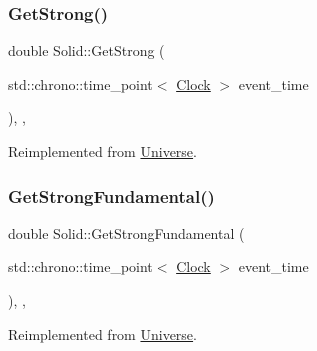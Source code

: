 \mbox{\label{classSolid_ae39d0166456b8feaa39547e5a21c9096}} 
\subsubsection{\texorpdfstring{Get\+Strong()}{GetStrong()}}
{\footnotesize\ttfamily double Solid\+::\+Get\+Strong (\begin{DoxyParamCaption}\item[{std\+::chrono\+::time\+\_\+point$<$ \mbox{\hyperlink{universe_8h_a0ef8d951d1ca5ab3cfaf7ab4c7a6fd80}{Clock}} $>$}]{event\+\_\+time }\end{DoxyParamCaption})\hspace{0.3cm}{\ttfamily [inline]}, {\ttfamily [final]}, {\ttfamily [virtual]}}



Reimplemented from \mbox{\hyperlink{classUniverse_acb453ce71da418c5b5617fecede9571b}{Universe}}.

\mbox{\label{classSolid_ab3a972354b25ad1bbe8c3f3e7638e24c}} 
\subsubsection{\texorpdfstring{Get\+Strong\+Fundamental()}{GetStrongFundamental()}}
{\footnotesize\ttfamily double Solid\+::\+Get\+Strong\+Fundamental (\begin{DoxyParamCaption}\item[{std\+::chrono\+::time\+\_\+point$<$ \mbox{\hyperlink{universe_8h_a0ef8d951d1ca5ab3cfaf7ab4c7a6fd80}{Clock}} $>$}]{event\+\_\+time }\end{DoxyParamCaption})\hspace{0.3cm}{\ttfamily [inline]}, {\ttfamily [final]}, {\ttfamily [virtual]}}



Reimplemented from \mbox{\hyperlink{classUniverse_ab44daccba01ee7e3cf9b50bba83dd19e}{Universe}}.

\mbox{\label{classSolid_a9cfde1c3a4b7c6d2a5a3719d74e27237}} 
